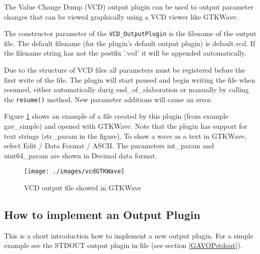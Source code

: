 The Value Change Dump (VCD) output plugin can be used to output
parameter changes that can be viewed graphically using a VCD viewer
like GTKWave.

The constructor parameter of the \lstinline|VCD_OutputPlugin| is the
filename of the output file. The default filename (for the plugin's
default output plugin) is {\sffamily default.vcd}. If the filename
string has not the postfix '{\sffamily .vcd}' it will be appended
automatically.

Due to the structure of VCD files all parameters must be registered
before the first write of the file. The plugin will start paused and
begin writing the file when resumed, either automatically durig
end\_of\_elaboration or manually by calling the \lstinline|resume()|
method. New parameter additions will cause an error.

Figure \ref{fig:GAVvcdGTKWave} shows an example of a file created by
this plugin (from example gav\_simple) and opened with GTKWave. Note
that the plugin has support for text strings (str\_param in the
figure). To show a wave as a text in GTKWave, select Edit / Data
Format / ASCII. The parameters int\_param and uint64\_param are shown
in Decimal data format.

\begin{figure}[htbp]
	\centerline{
		\texttt{[image: ./images/vcdGTKWave]}}
	\caption{VCD output file showed in GTKWave}
	\label{fig:GAVvcdGTKWave}
\end{figure}


\subsection{How to implement an Output Plugin}
\label{GAVimplementOP}

This is a short introduction how to implement a new output plugin. For a simple example see the STDOUT output plugin in file  (see section \ref{GAVOPstdout}).

